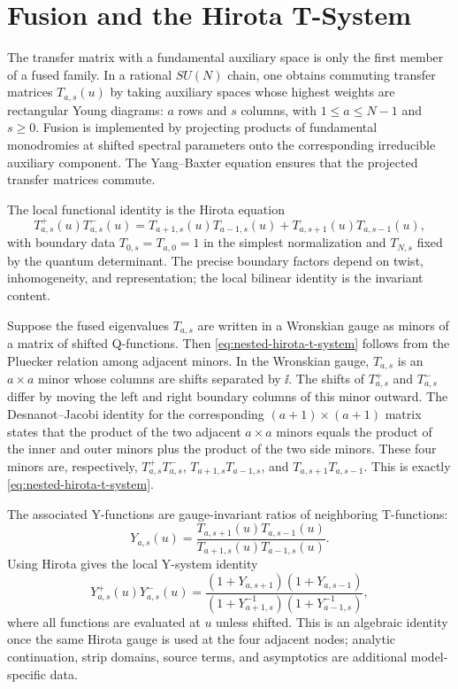 \section{Fusion and the Hirota T-System}

The transfer matrix with a fundamental auxiliary space is only the first
member of a fused family.  In a rational \(SU(N)\) chain, one obtains
commuting transfer matrices \(T_{a,s}(u)\) by taking auxiliary spaces whose
highest weights are rectangular Young diagrams: \(a\) rows and \(s\) columns,
with \(1\le a\le N-1\) and \(s\ge0\).  Fusion is implemented by projecting
products of fundamental monodromies at shifted spectral parameters onto the
corresponding irreducible auxiliary component.  The Yang--Baxter equation
ensures that the projected transfer matrices commute.

The local functional identity is the Hirota equation
\begin{equation}
  T_{a,s}^{+}(u)T_{a,s}^{-}(u)
  =
  T_{a+1,s}(u)T_{a-1,s}(u)
  +
  T_{a,s+1}(u)T_{a,s-1}(u),
  \label{eq:nested-hirota-t-system}
\end{equation}
with boundary data \(T_{0,s}=T_{a,0}=1\) in the simplest normalization and
\(T_{N,s}\) fixed by the quantum determinant.  The precise boundary factors
depend on twist, inhomogeneity, and representation; the local bilinear
identity is the invariant content.

Suppose the fused eigenvalues \(T_{a,s}\) are written in a Wronskian gauge as
minors of a matrix of shifted Q-functions.  Then
\eqref{eq:nested-hirota-t-system} follows from the Pluecker relation among
adjacent minors.
In the Wronskian gauge, \(T_{a,s}\) is an \(a\times a\) minor whose columns
are shifts separated by \(\ii\).  The shifts of \(T_{a,s}^{+}\) and
\(T_{a,s}^{-}\) differ by moving the left and right boundary columns of this
minor outward.  The Desnanot--Jacobi identity for the corresponding
\((a+1)\times(a+1)\) matrix states that the product of the two adjacent
\(a\times a\) minors equals the product of the inner and outer minors plus
the product of the two side minors.  These four minors are, respectively,
\(T_{a,s}^{+}T_{a,s}^{-}\),
\(T_{a+1,s}T_{a-1,s}\), and \(T_{a,s+1}T_{a,s-1}\).  This is exactly
\eqref{eq:nested-hirota-t-system}.

The associated Y-functions are gauge-invariant ratios of neighboring
T-functions:
\begin{equation}
  Y_{a,s}(u)
  =
  \frac{T_{a,s+1}(u)T_{a,s-1}(u)}
       {T_{a+1,s}(u)T_{a-1,s}(u)}.
  \label{eq:t-to-y-definition}
\end{equation}
Using Hirota gives the local Y-system identity
\begin{equation}
  Y_{a,s}^{+}(u)Y_{a,s}^{-}(u)
  =
  \frac{(1+Y_{a,s+1})(1+Y_{a,s-1})}
       {(1+Y_{a+1,s}^{-1})(1+Y_{a-1,s}^{-1})},
  \label{eq:hirota-to-y-system}
\end{equation}
where all functions are evaluated at \(u\) unless shifted.  This is an
algebraic identity once the same Hirota gauge is used at the four adjacent
nodes; analytic continuation, strip domains, source terms, and asymptotics
are additional model-specific data.

